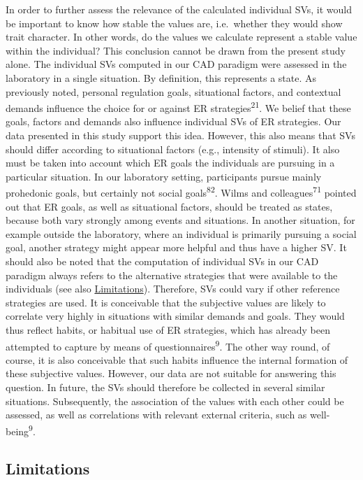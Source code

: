 \documentclass[
  man,floatsintext]{apa6}
\begin{document}
In order to further assess the relevance of the calculated individual SVs, it would be important to know how stable the values are, i.e.~whether they would show trait character.
In other words, do the values we calculate represent a stable value within the individual?
This conclusion cannot be drawn from the present study alone.
The individual SVs computed in our CAD paradigm were assessed in the laboratory in a single situation.
By definition, this represents a state.
As previously noted, personal regulation goals, situational factors, and contextual demands influence the choice for or against ER strategies\textsuperscript{21}.
We belief that these goals, factors and demands also influence individual SVs of ER strategies.
Our data presented in this study support this idea.
However, this also means that SVs should differ according to situational factors (e.g., intensity of stimuli).
It also must be taken into account which ER goals the individuals are pursuing in a particular situation.
In our laboratory setting, participants pursue mainly prohedonic goals, but certainly not social goals\textsuperscript{82}.
Wilms and colleagues\textsuperscript{71} pointed out that ER goals, as well as situational factors, should be treated as states, because both vary strongly among events and situations.
In another situation, for example outside the laboratory, where an individual is primarily pursuing a social goal, another strategy might appear more helpful and thus have a higher SV.
It should also be noted that the computation of individual SVs in our CAD paradigm always refers to the alternative strategies that were available to the individuals (see also \protect\hyperlink{Limitations}{Limitations}).
Therefore, SVs could vary if other reference strategies are used.
It is conceivable that the subjective values are likely to correlate very highly in situations with similar demands and goals.
They would thus reflect habits, or habitual use of ER strategies, which has already been attempted to capture by means of questionnaires\textsuperscript{9}.
The other way round, of course, it is also conceivable that such habits influence the internal formation of these subjective values.
However, our data are not suitable for answering this question.
In future, the SVs should therefore be collected in several similar situations.
Subsequently, the association of the values with each other could be assessed, as well as correlations with relevant external criteria, such as well-being\textsuperscript{9}.

\hypertarget{limitations}{%
\subsection{Limitations}\label{limitations}}
\end{document}
